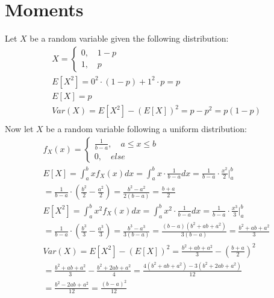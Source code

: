 \documentclass[11pt,a4paper,margin=1in]{article}
\begin{document}
\section{Moments}
Let $X$ be a random variable given the following distribution:
\begin{gather*}
    X = \begin{cases} 0, \quad 1 - p \\ 1, \quad p \end{cases} \\
    E[X^2] = 0^2 \cdot (1 - p) + 1^2 \cdot p = p \\
    E[X] = p \\
    Var(X) = E[X^2] - (E[X])^2 = p - p^2 = p(1 - p) \\
\end{gather*}
Now let $X$ be a random variable following a uniform distribution:
\begin{gather*}
    f_X(x) = \begin{cases} \frac{1}{b - a}, \quad a \leq x \leq b \\ 0, \quad else \end{cases} \\
    E[X] = \int_{a}^{b} x f_X(x) dx = \int_{a}^{b} x \cdot \frac{1}{b - a} dx = \frac{1}{b - a} \cdot \frac{x^2}{2} \bigg|_{a}^{b} \\
    = \frac{1}{b - a} \cdot \left( \frac{b^2}{2} - \frac{a^2}{2} \right) = \frac{b^2 - a^2}{2(b - a)} = \frac{b + a}{2} \\
    E[X^2] = \int_{a}^{b} x^2 f_X(x) dx = \int_{a}^{b} x^2 \cdot \frac{1}{b - a} dx = \frac{1}{b - a} \cdot \frac{x^3}{3} \bigg|_{a}^{b} \\
    = \frac{1}{b - a} \cdot \left( \frac{b^3}{3} - \frac{a^3}{3} \right) = \frac{b^3 - a^3}{3(b - a)} = \frac{(b - a)(b^2 + ab + a^2)}{3(b - a)} = \frac{b^2 + ab + a^2}{3} \\
    Var(X) = E[X^2] - (E[X])^2 = \frac{b^2 + ab + a^2}{3} - \left( \frac{b + a}{2} \right)^2 \\
    = \frac{b^2 + ab + a^2}{3} - \frac{b^2 + 2ab + a^2}{4} = \frac{4(b^2 + ab + a^2) - 3(b^2 + 2ab + a^2)}{12} \\
    = \frac{b^2 - 2ab + a^2}{12} = \frac{(b - a)^2}{12}
\end{gather*}
\end{document}

